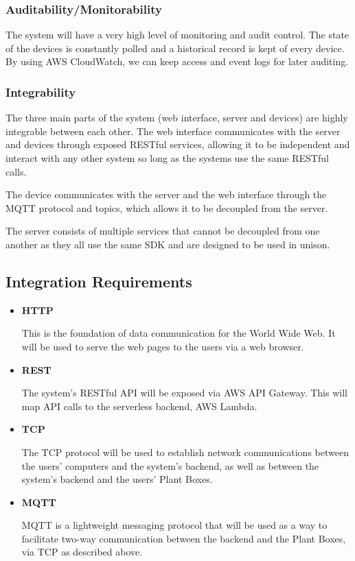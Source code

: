 \documentclass{article}
\begin{document}
		\subsubsection{Auditability/Monitorability}
			The system will have a very high level of monitoring and audit control. The state of the devices is constantly polled and a historical record is kept of every device. By using AWS CloudWatch, we can keep access and event logs for later auditing.
			
		\subsubsection{Integrability}
			The three main parts of the system (web interface, server and devices) are highly integrable between each other. The web interface communicates with the server and devices through exposed RESTful services, allowing it to be independent and interact with any other system so long as the systems use the same RESTful calls.
			
			The device communicates with the server and the web interface through the MQTT protocol and topics, which allows it to be decoupled from the server.
			
			The server consists of multiple services that cannot be decoupled from one another as they all use the same SDK and are designed to be used in unison.

\subsection{Integration Requirements}
\begin{itemize}
	\item \textbf{HTTP}
	
	This is the foundation of data communication for the World Wide Web. It will be used to serve the web pages to the users via a web browser.	
	\item \textbf{REST}
	
	The system's RESTful API will be exposed via AWS API Gateway. This will map API calls to the serverless backend, AWS Lambda.
	\item \textbf{TCP}
	
	The TCP protocol will be used to establish network communications between the users' computers and the system's backend, as well as between the system's backend and the users' Plant Boxes.
	\item \textbf{MQTT}
	
	MQTT is a lightweight messaging protocol that will be used as a way to facilitate two-way communication between the backend and the Plant Boxes, via TCP as described above.  
	
\end{itemize}
\end{document}
